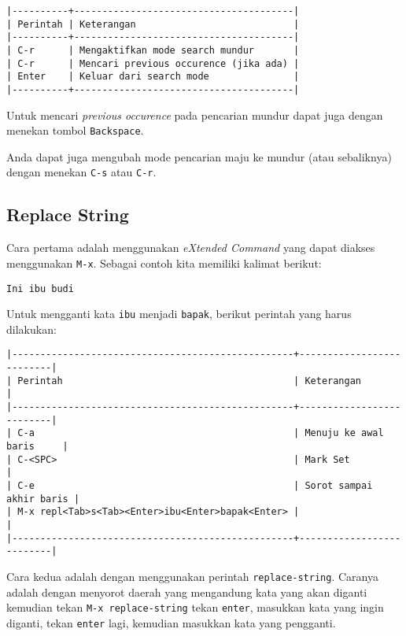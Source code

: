 \documentclass{article}
\begin{document}
\begin{verbatim}
|----------+---------------------------------------|
| Perintah | Keterangan                            |
|----------+---------------------------------------|
| C-r      | Mengaktifkan mode search mundur       |
| C-r      | Mencari previous occurence (jika ada) |
| Enter    | Keluar dari search mode               |
|----------+---------------------------------------|
\end{verbatim}

Untuk mencari \emph{previous occurence} pada pencarian mundur dapat juga
dengan menekan tombol \verb=Backspace=.

Anda dapat juga mengubah mode pencarian maju ke mundur (atau sebaliknya)
dengan menekan \verb=C-s= atau \verb=C-r=.

\subsection{Replace String}

Cara pertama adalah menggunakan \emph{eXtended Command} yang dapat diakses
menggunakan \verb=M-x=. Sebagai contoh kita memiliki kalimat berikut:

\begin{verbatim}
Ini ibu budi
\end{verbatim}

Untuk mengganti kata \verb=ibu= menjadi \verb=bapak=, berikut perintah yang
harus dilakukan:

\begin{verbatim}
|--------------------------------------------------+--------------------------|
| Perintah                                         | Keterangan               |
|--------------------------------------------------+--------------------------|
| C-a                                              | Menuju ke awal baris     |
| C-<SPC>                                          | Mark Set                 |
| C-e                                              | Sorot sampai akhir baris |
| M-x repl<Tab>s<Tab><Enter>ibu<Enter>bapak<Enter> |                          |
|--------------------------------------------------+--------------------------|
\end{verbatim}

Cara kedua adalah dengan menggunakan perintah \verb=replace-string=.
Caranya adalah dengan menyorot daerah yang mengandung kata yang akan diganti
kemudian tekan \verb=M-x replace-string= tekan \verb=enter=, masukkan kata
yang ingin diganti, tekan \verb=enter= lagi, kemudian masukkan kata yang
pengganti.
\end{document}
